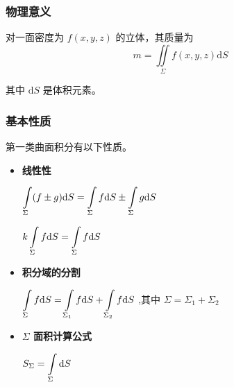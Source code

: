 \subsubsection{物理意义}

对一面密度为 $ f(x,y,z) $ 的立体，其质量为$$
    m = \iint\limits_{\Sigma} f(x,y,z)\mathrm{d}S
$$ 

其中 $ \mathrm{d}S $ 是体积元素。

\subsubsection{基本性质}

第一类曲面积分有以下性质。

\begin{itemize}
    \item \textbf{线性性}
    
    $\displaystyle \int\limits_\Sigma (f\pm g)\mathrm{d}S = \int\limits_\Sigma f\mathrm{d}S \pm \int\limits_\Sigma g\mathrm{d}S $ 

    $ \displaystyle k\int\limits_\Sigma f\mathrm{d}S = \int\limits_\Sigma f\mathrm{d}S $ 
    \item \textbf{积分域的分割}
    
    $\displaystyle \int\limits_\Sigma f\mathrm{d}S = \int\limits_{\Sigma_1}f\mathrm{d}S + \int\limits_{\Sigma_2}f\mathrm{d}S$
    ,其中 $ \Sigma=\Sigma_1+\Sigma_2 $ 
    \item \textbf{$ \Sigma $ 面积计算公式}
    
    $\displaystyle S_\Sigma = \int\limits_\Sigma\mathrm{d}S$ 
\end{itemize}

